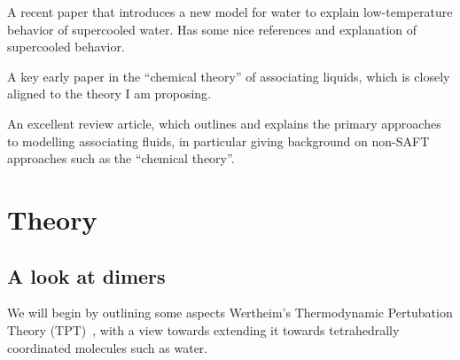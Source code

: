 \documentclass[letterpaper,twocolumn,amsmath,amssymb,pre]{revtex4-1}
\begin{document}
A recent paper that introduces a new model for water to explain
low-temperature behavior of supercooled water\cite{tu2009anomalies}.
Has some nice references and explanation of supercooled behavior.

A key early paper in the ``chemical theory'' of associating liquids,
which is closely aligned to the theory I am
proposing\cite{heidemann1976van}.

An excellent review article, which outlines and explains the primary
approaches to modelling associating fluids, in particular giving
background on non-SAFT approaches such as the ``chemical
theory''\cite{muller2001molecular}.

\section{Theory}

\subsection{A look at dimers}

We will begin by outlining some aspects Wertheim's Thermodynamic
Pertubation Theory (TPT)~\cite{wertheim1984fluidsI,
  *wertheim1984fluidsII, *wertheim1986fluidsIII},
with a view towards extending it towards tetrahedrally coordinated
molecules such as water.

\newcommand\nI{\ensuremath{{n^{(1)}}}}
\newcommand\nII{\ensuremath{{n^{(2)}}}}

\newcommand\PI{\ensuremath{{P^{(1)}}}}
\newcommand\PII{\ensuremath{{P^{(2)}}}}
\end{document}
